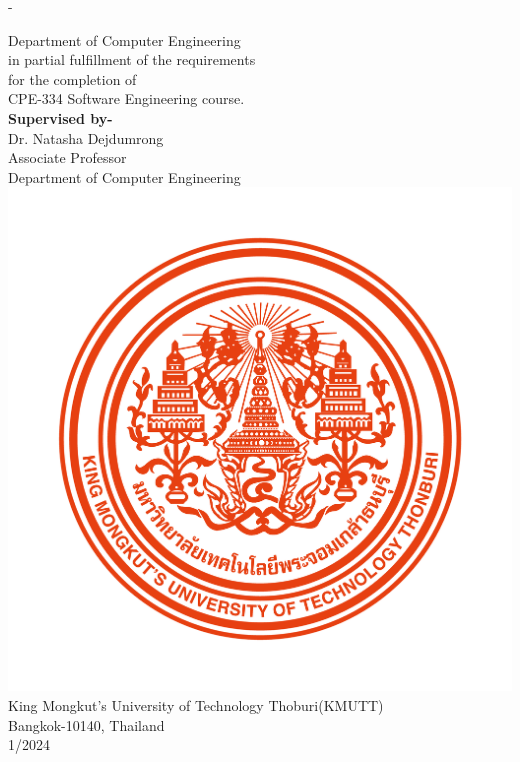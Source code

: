 \begin{titlingpage}
\begin{SingleSpace}
\begin{adjustwidth*}{\unitlength}{-\unitlength}
\begin{center}
				{\large {Department of Computer Engineering}}\\
				{\large {in partial fulfillment of the requirements \\ for the completion of\\ CPE-334 Software Engineering course.}}\\
				\vspace{12mm}
				{\large \textbf{Supervised by-} }\\
				\vspace{3mm}
				{\large{Dr. Natasha Dejdumrong}}\\
				{\large {Associate Professor}}\\

				{\large {Department of Computer Engineering}}\\
				\vspace{12mm}
				\includegraphics[scale=0.25]{frontmatter/KMUTT_CI.png} \\[0.25cm]
				\vspace{12mm}
				{\large King Mongkut's University of Technology Thoburi(KMUTT)}\\
				{\large Bangkok-10140, Thailand}\\
				{\large 1/2024}\\
			\end{center}
		\end{adjustwidth*}
	\end{SingleSpace}
\end{titlingpage}
